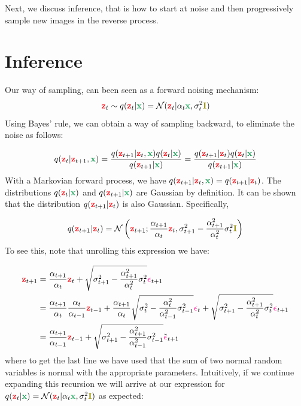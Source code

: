 \documentclass[usenames,dvipsnames]{article}
\newcommand{\myvec}[1]{\mathbf{#1}}
\newcommand{\myvecsym}[1]{\boldsymbol{#1}}
\newcommand{\vx}{\myvec{\textcolor{ForestGreen}{x}}}
\newcommand{\vz}{\myvec{\textcolor{Red}{z}}}
\newcommand{\vI}{\myvec{\textcolor{olive}{I}}}
\newcommand{\vepsilon}{\myvecsym{\textcolor{CarnationPink}{\epsilon}}}
\newcommand{\gauss}{\mathcal{N}}
\begin{document}
Next, we discuss inference, that is how to start at noise and then progressively sample new images in the reverse process.












\section{Inference}


Our way of sampling, can been seen as a forward noising mechanism:
\begin{align}
\vz_t \sim q(\vz_t|\vx) = \gauss(\vz_t|\alpha_t \vx, \sigma_t^2 \vI)
\nonumber
\end{align}
Using Bayes' rule, we can obtain a way of sampling backward, to eliminate the noise as follows:

\begin{align}
q(\vz_{t}|\vz_{t+1},\vx) = \frac{q(\vz_{t+1}|\vz_{t},\vx)q(\vz_{t}|\vx)}{q(\vz_{t+1}|\vx)}
= \frac{q(\vz_{t+1}|\vz_{t})q(\vz_{t}|\vx)}{q(\vz_{t+1}|\vx)}
\nonumber
\end{align}
With a Markovian forward process, we have $q(\vz_{t+1}|\vz_{t},\vx)=q(\vz_{t+1}|\vz_{t})$. The distributions $q(\vz_{t}|\vx)$ and $q(\vz_{t+1}|\vx)$ are Gaussian by definition. It can be shown that the distribution $q(\vz_{t+1}|\vz_{t})$ is also Gaussian.  Specifically,

\begin{align}
q(\vz_{t+1}|\vz_{t}) = \mathcal{N}\left(\vz_{t+1};  \frac{\alpha_{t+1}}{\alpha_t} \vz_{t},   \sigma_{t+1}^2 - \frac{\alpha_{t+1}^2}{\alpha_t^2} \sigma_t^2  \vI\right)
\end{align}
To see this, note that unrolling this expression we have:

\begin{align}
\vz_{t+1} &= \frac{\alpha_{t+1}}{\alpha_t} \vz_{t} + \sqrt{\sigma_{t+1}^2 - \frac{\alpha_{t+1}^2}{\alpha_t^2} \sigma_t^2} \vepsilon_{t+1} \nonumber \\
&= \frac{\alpha_{t+1}}{\alpha_t} \frac{\alpha_{t}}{\alpha_{t-1}} \vz_{t-1} +  \frac{\alpha_{t+1}}{\alpha_t}  \sqrt{\sigma_{t}^2 - \frac{\alpha_{t}^2}{\alpha_{t-1}^2} \sigma_{t-1}^2} \vepsilon_{t} + \sqrt{\sigma_{t+1}^2 - \frac{\alpha_{t+1}^2}{\alpha_t^2} \sigma_t^2} \vepsilon_{t+1} \nonumber \\
&= \frac{\alpha_{t+1}}{\alpha_{t-1}} \vz_{t-1} +    \sqrt{\sigma_{t+1}^2 - \frac{\alpha_{t+1}^2}{\alpha_{t-1}^2} \sigma_{t-1}^2} \tilde{\vepsilon}_{t+1} \nonumber
\end{align}
where to get the last line we have used that the sum of two normal random variables is normal with the appropriate parameters. Intuitively, if we continue expanding this recursion we will arrive at our expression for $q(\vz_t|\vx) = \gauss(\vz_t|\alpha_t \vx, \sigma_t^2 \vI)$ as expected:
\end{document}
